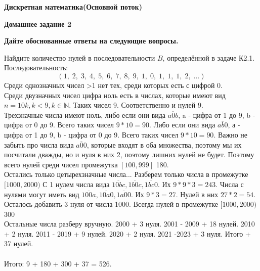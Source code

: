 \documentclass[11pt]{article}
\def\week{2}
\def\theproblem{К\week.\arabic{problem}}
\begin{document}
	\setcounter{problem}{0}
	\def\theproblem{Д\week.\arabic{problem}}
	{\textbf{\large Дискретная математика}\hfill \textbf{(Основной поток)}
		
		\medskip %
		
		\textbf{Домашнее задание \week}}
	
	\medskip
	
	\textbf{Дайте обоснованные ответы на следующие вопросы.}
	
	
	\vspace{5mm}
	
	
	\p Найдите количество нулей в последовательности $B$, определённой в задаче К2.1.\\
	Последовательность: \[
	(1,\;2,\;3,\;4,\;5,\;6,\;7,\;8,\;9,\;1,\;0,\;1,\;1,\;1,\;2,\;\dots )
	\]
	Среди однозначных чисел >1 нет тех, среди которых есть с цифрой 0.\\
	Среди двузначных чисел цифра ноль есть в числах, которые имеют вид $n = 10k, k < 9, k \in \mathbb{N}$. Таких чисел 9. Соответственно и нулей 9.\\
	Трехзначные числа имеют ноль, либо если они вида $\overline{a0b}$, a - цифра от 1 до 9, b - цифра от 0 до 9. Всего таких чисел $9 * 10 = 90$. Либо если они вида $\overline{ab0}$, а - цифра от 1 до 9, b - цифра от 0 до 9. Всего таких чисел $9 * 10 = 90$. Важно не забыть про числа вида $\overline{a00}$, которые входят в оба множества, поэтому мы их посчитали дважды, но и нуля в них 2, поэтому лишних нулей не будет. 
	Поэтому всего нулей среди чисел промежутка $[100, 999]$ 180.\\
	Остались только цетырехзначные числа... Разберем только числа в промежутке $[1000, 2000)$ С 1 нулем числа вида $\overline{10bc}, \overline{1b0c}, \overline{1bc0}$. Их $ 9 * 9 * 3 = 243$. Числа с нулями могут иметь вид $\overline{100a}, \overline{10a0}, \overline{1a00}$. Их $9 * 3 = 27$. Нулей в них $27 * 2 = 54$. Осталось добавить 3 нуля от числа 1000. Всегда нулей в промежутке $[1000, 2000)$ 300\\
	Остальные числа разберу вручную. 2000 + 3 нуля. 2001 - 2009 + 18 нулей. 2010 + 2 нуля. 2011 - 2019 + 9 нулей. 2020 + 2 нуля. 2021 -2023 + 3 нуля. Итого + 37 нулей.\\
	\\
	Итого: 9 + 180 + 300 + 37 = 526. 
	
\end{document}
